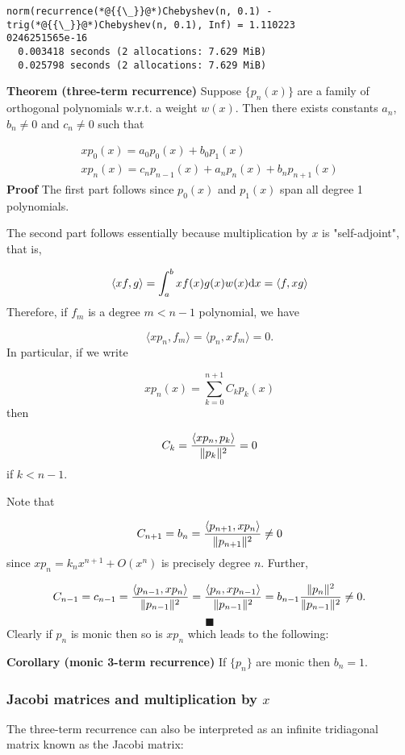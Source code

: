 \documentclass[12pt,a4paper]{article}
\begin{document}
\begin{lstlisting}
norm(recurrence(*@{{\_}}@*)Chebyshev(n, 0.1) - trig(*@{{\_}}@*)Chebyshev(n, 0.1), Inf) = 1.110223
0246251565e-16
  0.003418 seconds (2 allocations: 7.629 MiB)
  0.025798 seconds (2 allocations: 7.629 MiB)
\end{lstlisting}


\textbf{Theorem (three-term recurrence)} Suppose $\{p_n(x)\}$ are a family of orthogonal polynomials w.r.t. a weight $w(x)$. Then there exists constants $a_n$, $b_n \neq 0$ and $c_n \neq 0$ such that


\begin{align*}
x p_0(x) = a_0 p_0(x) + b_0 p_1(x) \\
x p_n(x) = c_n p_{n-1}(x) + a_n p_n(x) + b_n p_{n+1}(x)
\end{align*}
\textbf{Proof} The first part follows since $p_0(x)$ and $p_1(x)$ span all degree 1 polynomials.

The second part follows essentially because multiplication by $x$ is "self-adjoint", that is,

\[
\langle x f, g\rangle = \int_a^b x f(x) g(x) w(x) {\rm d}x = \langle f, x g \rangle
\]
Therefore, if $f_m$ is a degree $m < n-1$ polynomial, we have

\[
\langle x p_n, f_m\rangle = \langle p_n, x f_m\rangle = 0.
\]
In particular, if we write

\[
x p_n(x) = \sum_{k=0}^{n+1} C_k p_k(x)
\]
then

\[
C_k = {\langle x p_n, p_k\rangle \over \| p_k\|^2} = 0
\]
if $k < n-1$.

Note that

\[
C_{n+1} = b_n = {\ensuremath{\langle}p_{n+1}, x p_n\ensuremath{\rangle} \over \|p_{n+1} \|^2} \ensuremath{\ne} 0
\]
since $x p_n = k_n x^{n+1} + O(x^n)$ is precisely degree $n$. Further,

\[
C_{n-1} = c_{n-1} = {\ensuremath{\langle}p_{n-1}, x p_n\ensuremath{\rangle} \over \|p_{n-1}\|^2 } =
{\ensuremath{\langle}p_n, x p_{n-1}\ensuremath{\rangle}  \over \|p_{n-1}\|^2 } =  b_{n-1}{\|p_n\|^2  \over \|p_{n-1}\|^2 } \ensuremath{\ne} 0.
\]
\[
\blacksquare
\]
Clearly if $p_n$ is monic then so is $x p_n$ which leads to the following:

\textbf{Corollary (monic 3-term recurrence)} If $\{p_n\}$ are monic then $b_n =  1$.

\subsubsection{Jacobi matrices and multiplication by $x$}
The three-term recurrence can also be interpreted as an infinite tridiagonal matrix known as the Jacobi matrix:
\end{document}
